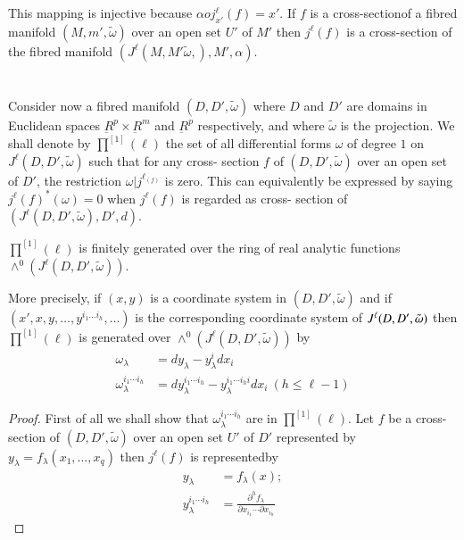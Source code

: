 This mapping is injective because $\alpha o j^\ell_{x'}(f) = x'$. If
$f$ is a  cross-section\pageoriginale of a fibred manifold $(M, m', \tilde{\omega})$
over an open set $U'$ of $M'$ then $j^\ell (f)$ is a cross-section of
the fibred manifold $(J^\ell (M, M' \tilde{\omega}, ), M', \alpha)$. 

\section{}\label{chap3:sec3.2}%

Consider now a fibred manifold $(D, D', \tilde{\omega})$ where $D$ and
$D'$ are domains in Euclidean spaces $\underbar{R}^p \times
\underbar{R}^m$ and $\underbar{R}^p$ respectively, and where
$\tilde{\omega}$ is the projection. We shall denote by $\prod ^{[1]}
(\ell)$ the set of all differential forms $\omega$ of degree $1$ on
$J^\ell (D, D', \tilde{\omega})$ such that for any cross- section $f$
of $(D, D', \tilde{\omega})$ over an open set of $D'$, the restriction
$\omega | j^{\ell_{(f)}}$ is zero. This can equivalently be expressed
by saying $j^\ell (f)^* (\omega) = 0$ when $j^\ell (f)$ is regarded as
cross- section of $(J^\ell (D, D', \tilde{\omega}), D', d)$. 

\setcounter{proposition}{0}
\begin{proposition}\label{chap3:sec3.2:prop1}%
  $\prod ^{[1]} (\ell)$ is finitely generated over the ring of real
  analytic functions $\wedge^0 (J^\ell (D, D', \tilde{\omega}))$. 
\end{proposition}

More precisely, if $(x, y)$ is a coordinate system in $(D, D',
\tilde{\omega})$ and if $(x', x, y, \ldots , y^{i_1 \ldots i_h},
\ldots)$ is the corresponding coordinate system of $J^\ell (D,\break D',
\tilde{\omega})$ then $\prod^{[1]}(\ell)$ is generated over $\wedge^0
(J^\ell(D, D', \tilde{\omega}))$ by  
\begin{align*}
  \omega_\lambda & = dy_{\lambda} - y^i_\lambda dx_i \\
  \omega^{i_1 \cdots i_h}_\lambda & = dy^{i_1 \cdots i_h}_{\lambda} -
  y^{i_1 \cdots i_h i}_\lambda dx_i ~(h \leq \ell - 1) 
\end{align*}

\begin{proof}
  First of all we shall show that $\omega^{i_1 \cdots i_h}_\lambda$
  are in $\prod^{[1]} (\ell)$. Let $f$ be a cross-section of $(D, D',
  \tilde{\omega})$ over an open set $U'$ of $D'$ represented by
  $y_\lambda = f_{\lambda} (x_1, \ldots , x_q)$ then $j^\ell (f)$ is
  represented\pageoriginale by  
  \begin{align*}
    y_{\lambda} & = f_{\lambda} (x); \\
    y^{i_1 \cdots i_h}_\lambda & = \frac{\partial^h f_\lambda} {\partial
    x_{i_1} \cdots \partial x_{i_h}} 
  \end{align*}
\end{proof}

